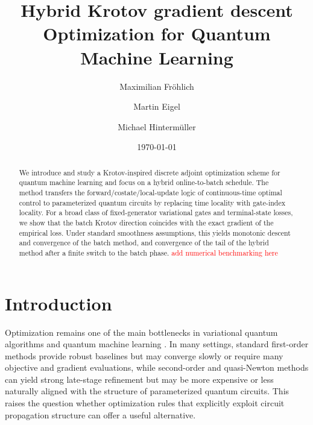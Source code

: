 \documentclass[aps,prb,10pt,twocolumn,superscriptaddress]{revtex4-2}
\begin{document}
\title{Hybrid Krotov gradient descent Optimization for Quantum Machine Learning}


\author{Maximilian Fröhlich}
\author{Martin Eigel}
\author{Michael Hintermüller}

\date{\today}





\begin{abstract}
We introduce and study a Krotov-inspired discrete adjoint optimization scheme for quantum machine learning and focus on a hybrid online-to-batch schedule. The method transfers the forward/costate/local-update logic of continuous-time optimal control to parameterized quantum circuits by replacing time locality with gate-index locality. For a broad class of fixed-generator variational gates and terminal-state losses, we show that the batch Krotov direction coincides with the exact gradient of the empirical loss. Under standard smoothness assumptions, this yields monotonic descent and convergence of the batch method, and convergence of the tail of the hybrid method after a finite switch to the batch phase. \textcolor{red}{add numerical benchmarking here}
\end{abstract}


\maketitle
\section{Introduction}

Optimization remains one of the main bottlenecks in variational quantum algorithms and quantum machine learning \cite{CerezoEtAl2021VQA,McCleanEtAl2016Theory,MollEtAl2018QST,BiamonteEtAl2017QML,KandalaEtAl2017HEA,McCleanEtAl2018Barren,WangEtAl2021NoiseBP}. In many settings, standard first-order methods provide robust baselines but may converge slowly or require many objective and gradient evaluations, while second-order and quasi-Newton methods can yield strong late-stage refinement but may be more expensive or less naturally aligned with the structure of parameterized quantum circuits. This raises the question whether optimization rules that explicitly exploit circuit propagation structure can offer a useful alternative.
\end{document}
